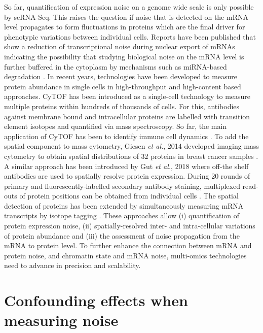 So far, quantification of expression noise on a genome wide scale is only possible by scRNA-Seq. This raises the question if noise that is detected on the mRNA level propagates to form fluctuations in proteins which are the final driver for phenotypic variations between individual cells. Reports have been published that show a reduction of transcriptional noise during nuclear export of mRNAs \citep{Battich2015a, BaharHalpern2015a} indicating the possibility that studying biological noise on the mRNA level is further buffered in the cytoplasm by mechanisms such as miRNA-based degradation \citep{Schmiedel2015}. In recent years, technologies have been developed to measure protein abundance in single cells in high-throughput and high-content based approaches. \Gls{CyTOF} has been introduced as a single-cell technology to measure multiple proteins within hundreds of thousands of cells. For this, antibodies against membrane bound and intracellular proteins are labelled with transition element isotopes and quantified via mass spectroscopy. So far, the main application of CyTOF has been to identify immune cell dynamics \citep{Bendall2011}. To add the spatial component to mass cytometry, Giesen \emph{et al.}, 2014 developed imaging mass cytometry to obtain spatial distributions of 32 proteins in breast cancer samples \citep{Giesen2014}. A similar approach has been introduced by Gut \emph{et al.}, 2018 where off-the shelf antibodies are used to spatially resolve protein expression. During 20 rounds of primary and fluorescently-labelled secondary antibody staining, multiplexed read-outs of protein positions can be obtained from individual cells \citep{Gut2018}. The spatial detection of proteins has been extended by simultaneously measuring mRNA transcripts by isotope tagging \cite{Schulz2018}. These approaches allow (i) quantification of protein expression noise, (ii) spatially-resolved inter- and intra-cellular variations of protein abundance and (iii) the assessment of noise propagation from the mRNA to protein level. To further enhance the connection between mRNA and protein noise, and chromatin state and mRNA noise, multi-omics technologies need to advance in precision and scalability.

\newpage

\section{Confounding effects when measuring noise}

